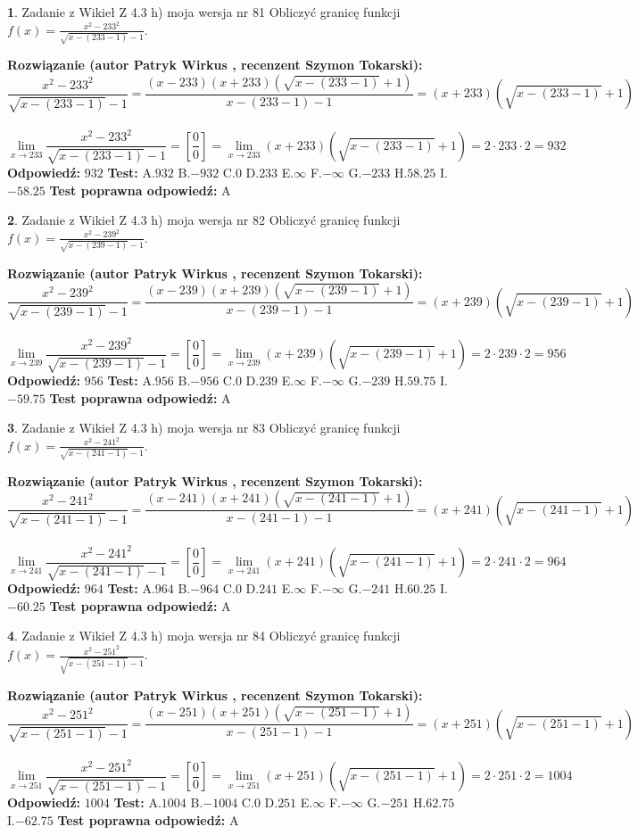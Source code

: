 \documentclass[12pt, a4paper]{article}
\theoremstyle{definition} %
\newtheorem{zad}{}
\newcommand{\zadStart}[1]{\begin{zad}#1\newline}
\newcommand{\zadStop}{\end{zad}}
\newcommand{\rozwStart}[2]{\noindent \textbf{Rozwiązanie (autor #1 , recenzent #2): }\newline}
\newcommand{\rozwStop}{\newline}
\newcommand{\odpStart}{\noindent \textbf{Odpowiedź:}\newline}
\newcommand{\odpStop}{\newline}
\newcommand{\testStart}{\noindent \textbf{Test:}\newline}
\newcommand{\testStop}{\newline}
\newcommand{\kluczStart}{\noindent \textbf{Test poprawna odpowiedź:}\newline}
\newcommand{\kluczStop}{\newline}
\begin{document}
\zadStart{Zadanie z Wikieł Z 4.3 h) moja wersja nr 81}
Obliczyć granicę funkcji $f(x)=\frac{x^{2} - 233^{2}}{\sqrt{x-(233-1)}-1}$.
\zadStop
\rozwStart{Patryk Wirkus}{Szymon Tokarski}
$$\frac{x^{2} - 233^{2}}{\sqrt{x-(233-1)}-1}=\frac{(x-233)(x+233)(\sqrt{x-(233-1)}+1)}{x-(233-1)-1}=(x+233)(\sqrt{x-(233-1)}+1)$$
\\
$$\lim\limits_{x\to 233}\frac{x^{2} - 233^{2}}{\sqrt{x-(233-1)}-1}=[\frac{0}{0}]=
\lim\limits_{x\to 233}(x+233)(\sqrt{x-(233-1)}+1) = 2\cdot233 \cdot 2 = 932$$
\rozwStop
\odpStart
$932$
\odpStop
\testStart
A.$932$
B.$-932$
C.$0$
D.$233$
E.$\infty$
F.$-\infty$
G.$-233$
H.$58.25$
I.$-58.25$
\testStop
\kluczStart
A
\kluczStop



\zadStart{Zadanie z Wikieł Z 4.3 h) moja wersja nr 82}
Obliczyć granicę funkcji $f(x)=\frac{x^{2} - 239^{2}}{\sqrt{x-(239-1)}-1}$.
\zadStop
\rozwStart{Patryk Wirkus}{Szymon Tokarski}
$$\frac{x^{2} - 239^{2}}{\sqrt{x-(239-1)}-1}=\frac{(x-239)(x+239)(\sqrt{x-(239-1)}+1)}{x-(239-1)-1}=(x+239)(\sqrt{x-(239-1)}+1)$$
\\
$$\lim\limits_{x\to 239}\frac{x^{2} - 239^{2}}{\sqrt{x-(239-1)}-1}=[\frac{0}{0}]=
\lim\limits_{x\to 239}(x+239)(\sqrt{x-(239-1)}+1) = 2\cdot239 \cdot 2 = 956$$
\rozwStop
\odpStart
$956$
\odpStop
\testStart
A.$956$
B.$-956$
C.$0$
D.$239$
E.$\infty$
F.$-\infty$
G.$-239$
H.$59.75$
I.$-59.75$
\testStop
\kluczStart
A
\kluczStop



\zadStart{Zadanie z Wikieł Z 4.3 h) moja wersja nr 83}
Obliczyć granicę funkcji $f(x)=\frac{x^{2} - 241^{2}}{\sqrt{x-(241-1)}-1}$.
\zadStop
\rozwStart{Patryk Wirkus}{Szymon Tokarski}
$$\frac{x^{2} - 241^{2}}{\sqrt{x-(241-1)}-1}=\frac{(x-241)(x+241)(\sqrt{x-(241-1)}+1)}{x-(241-1)-1}=(x+241)(\sqrt{x-(241-1)}+1)$$
\\
$$\lim\limits_{x\to 241}\frac{x^{2} - 241^{2}}{\sqrt{x-(241-1)}-1}=[\frac{0}{0}]=
\lim\limits_{x\to 241}(x+241)(\sqrt{x-(241-1)}+1) = 2\cdot241 \cdot 2 = 964$$
\rozwStop
\odpStart
$964$
\odpStop
\testStart
A.$964$
B.$-964$
C.$0$
D.$241$
E.$\infty$
F.$-\infty$
G.$-241$
H.$60.25$
I.$-60.25$
\testStop
\kluczStart
A
\kluczStop



\zadStart{Zadanie z Wikieł Z 4.3 h) moja wersja nr 84}
Obliczyć granicę funkcji $f(x)=\frac{x^{2} - 251^{2}}{\sqrt{x-(251-1)}-1}$.
\zadStop
\rozwStart{Patryk Wirkus}{Szymon Tokarski}
$$\frac{x^{2} - 251^{2}}{\sqrt{x-(251-1)}-1}=\frac{(x-251)(x+251)(\sqrt{x-(251-1)}+1)}{x-(251-1)-1}=(x+251)(\sqrt{x-(251-1)}+1)$$
\\
$$\lim\limits_{x\to 251}\frac{x^{2} - 251^{2}}{\sqrt{x-(251-1)}-1}=[\frac{0}{0}]=
\lim\limits_{x\to 251}(x+251)(\sqrt{x-(251-1)}+1) = 2\cdot251 \cdot 2 = 1004$$
\rozwStop
\odpStart
$1004$
\odpStop
\testStart
A.$1004$
B.$-1004$
C.$0$
D.$251$
E.$\infty$
F.$-\infty$
G.$-251$
H.$62.75$
I.$-62.75$
\testStop
\kluczStart
A
\kluczStop
\end{document}
